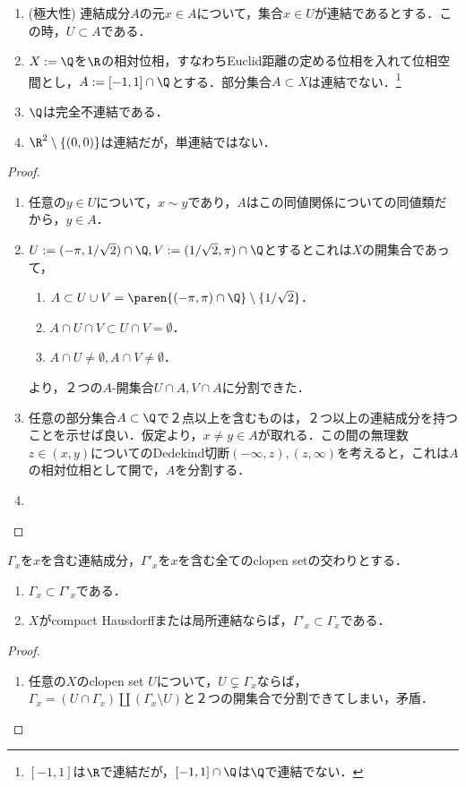 \documentclass[uplatex,dvipdfmx]{jsreport}
\begin{document}
\begin{lemma}\mbox{}
    \begin{enumerate}
        \item (極大性) 連結成分$A$の元$x\in A$について，集合$x\in U$が連結であるとする．この時，$U\subset A$である．
        \item $X:=\Q$を$\R$の相対位相，すなわちEuclid距離の定める位相を入れて位相空間とし，$A:=[-1,1]\cap\Q$とする．部分集合$A\subset X$は連結でない．\footnote{$[-1,1]$は$\R$で連結だが，$[-1,1]\cap\Q$は$\Q$で連結でない．}
        \item $\Q$は完全不連結である．
        \item $\R^2\setminus\{(0,0)\}$は連結だが，単連結ではない．
    \end{enumerate}
\end{lemma}
\begin{proof}\mbox{}
    \begin{enumerate}
        \item 任意の$y\in U$について，$x\sim y$であり，$A$はこの同値関係についての同値類だから，$y\in A$．
        \item $U:=(-\pi,1/\sqrt{2})\cap\Q,V:=(1/\sqrt{2},\pi)\cap\Q$とするとこれは$X$の開集合であって，\begin{enumerate}[1.]
            \item $A\subset U\cup V=\paren{(-\pi,\pi)\cap\Q}\setminus\{1/\sqrt{2}\}$．
            \item $A\cap U\cap V\subset U\cap V=\emptyset$．
            \item $A\cap U\ne\emptyset,A\cap V\ne\emptyset$．
        \end{enumerate}
        より，２つの$A$-開集合$U\cap A,V\cap A$に分割できた．
        \item 任意の部分集合$A\subset\Q$で２点以上を含むものは，２つ以上の連結成分を持つことを示せば良い．仮定より，$x\ne y\in A$が取れる．この間の無理数$z\in(x,y)$についてのDedekind切断$(-\infty,z),(z,\infty)$を考えると，これは$A$の相対位相として開で，$A$を分割する．
        \item 
    \end{enumerate}
\end{proof}

\begin{lemma}
    $\Gamma_x$を$x$を含む連結成分，$\Gamma'_x$を$x$を含む全てのclopen setの交わりとする．
    \begin{enumerate}
        \item $\Gamma_x\subset\Gamma'_x$である．
        \item $X$がcompact Hausdorffまたは局所連結ならば，$\Gamma'_x\subset\Gamma_x$である．
    \end{enumerate}
\end{lemma}
\begin{proof}\mbox{}
    \begin{enumerate}
        \item 任意の$X$のclopen set $U$について，$U\subsetneq\Gamma_x$ならば，$\Gamma_x=(U\cap\Gamma_x)\coprod(\Gamma_x\setminus U)$と２つの開集合で分割できてしまい，矛盾．
    \end{enumerate}
\end{proof}
\end{document}
